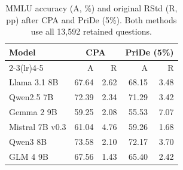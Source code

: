 \begin{table}[htbp]
\centering\small\setlength{\tabcolsep}{4pt}
\caption{MMLU accuracy (A, \%) and original RStd (R, pp) after CPA and PriDe (5\%). Both methods use all 13,592 retained questions.}
\label{tab:results-pride-mmlu}
\begin{tabular}{lrrrr}
\toprule
Model & \multicolumn{2}{c}{CPA} & \multicolumn{2}{c}{PriDe (5\%)}\\
\cmidrule(lr){2-3}\cmidrule(lr){4-5}
 & A & R & A & R\\
\midrule
Llama 3.1 8B & 67.64 & 2.62 & 68.15 & 3.48\\
Qwen2.5 7B & 72.39 & 2.34 & 71.29 & 3.42\\
Gemma 2 9B & 59.25 & 2.08 & 55.53 & 7.07\\
Mistral 7B v0.3 & 61.04 & 4.76 & 59.26 & 1.68\\
Qwen3 8B & 73.58 & 2.10 & 72.17 & 3.70\\
GLM 4 9B & 67.56 & 1.43 & 65.40 & 2.42\\
\bottomrule
\end{tabular}
\end{table}

